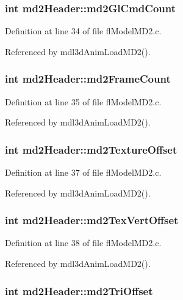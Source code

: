 \subsubsection{\setlength{\rightskip}{0pt plus 5cm}int {\bf md2Header::md2Gl\-Cmd\-Count}}\label{structmd2Header_5620662c6ad07235ee04897b7e8eedbe}




Definition at line 34 of file fl\-Model\-MD2.c.

Referenced by mdl3d\-Anim\-Load\-MD2().
\subsubsection{\setlength{\rightskip}{0pt plus 5cm}int {\bf md2Header::md2Frame\-Count}}\label{structmd2Header_8cc7fa289334410225bad982548fda40}




Definition at line 35 of file fl\-Model\-MD2.c.

Referenced by mdl3d\-Anim\-Load\-MD2().
\subsubsection{\setlength{\rightskip}{0pt plus 5cm}int {\bf md2Header::md2Texture\-Offset}}\label{structmd2Header_06a3bf40d5d8e0e6b06f5700e1a3956d}




Definition at line 37 of file fl\-Model\-MD2.c.

Referenced by mdl3d\-Anim\-Load\-MD2().
\subsubsection{\setlength{\rightskip}{0pt plus 5cm}int {\bf md2Header::md2Tex\-Vert\-Offset}}\label{structmd2Header_a38831e9cf97b745f528b2c123b8f090}




Definition at line 38 of file fl\-Model\-MD2.c.

Referenced by mdl3d\-Anim\-Load\-MD2().
\subsubsection{\setlength{\rightskip}{0pt plus 5cm}int {\bf md2Header::md2Tri\-Offset}}\label{structmd2Header_7ee5cd323121ae433c6bb3307b0eb4e9}




